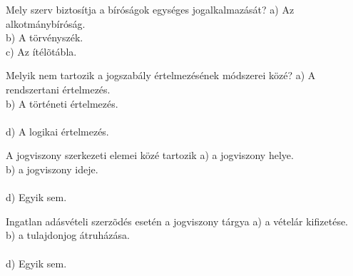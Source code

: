 \begin{frame}

\begin{tcolorbox}[title={33. Kérdés}]
Mely szerv biztosítja a bíróságok egységes jogalkalmazását?
\tcblower
a) Az alkotmánybíróság.\\
b) A törvényszék.\\
c) Az ítélõtábla.\\
\end{tcolorbox}

\begin{tcolorbox}[title={34. Kérdés}]
Melyik nem tartozik a jogszabály értelmezésének módszerei közé?
\tcblower
a) A rendszertani értelmezés.\\
b) A történeti értelmezés.\\
\\
d) A logikai értelmezés.
\end{tcolorbox}

\begin{tcolorbox}[title={35. Kérdés}]
A jogviszony szerkezeti elemei közé tartozik
\tcblower
a) a jogviszony helye.\\
b) a jogviszony ideje.\\
\\
d) Egyik sem.
\end{tcolorbox}

\begin{tcolorbox}[title={36. Kérdés}]
Ingatlan adásvételi szerzõdés esetén a jogviszony tárgya
\tcblower
a) a vételár kifizetése.\\
b) a tulajdonjog átruházása.\\
\\
d) Egyik sem.
\end{tcolorbox}

\end{frame}


